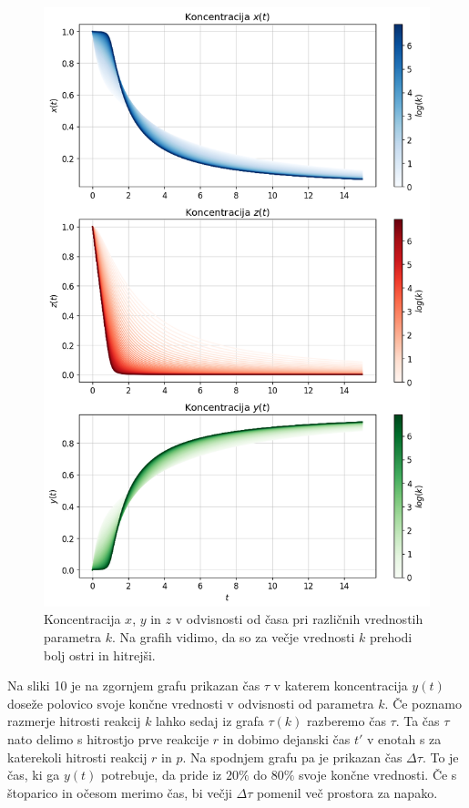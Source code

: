 \documentclass[slovene,11pt,a4paper]{article}
\begin{document}
\newpage

\begin{figure}[h!]
\centering
\includegraphics[width=14cm]{ura1.png}
\caption{Koncentracija $x$, $y$ in $z$ v odvisnosti od časa pri različnih vrednostih parametra $k$. Na grafih vidimo, da so za večje vrednosti $k$ prehodi bolj ostri in hitrejši.}
\end{figure}

\newpage

Na sliki 10 je na zgornjem grafu prikazan čas $\tau$ v katerem koncentracija $y(t)$ doseže polovico svoje končne vrednosti v odvisnosti od parametra $k$. Če poznamo razmerje hitrosti reakcij $k$ lahko sedaj iz grafa $\tau(k)$ razberemo čas $\tau$. Ta čas $\tau$ nato delimo s hitrostjo prve reakcije $r$ in dobimo dejanski čas $t'$ v enotah s za katerekoli hitrosti reakcij $r$ in $p$. Na spodnjem grafu pa je prikazan čas $\Delta \tau$. To je čas, ki ga $y(t)$ potrebuje, da pride iz $20\%$ do $80\%$ svoje končne vrednosti. Če s štoparico in očesom merimo čas, bi večji $\Delta\tau$ pomenil več prostora za napako.
\end{document}
